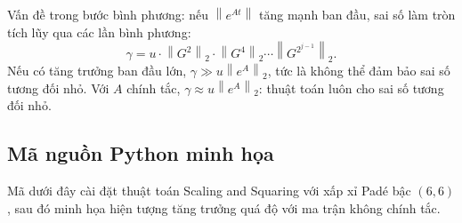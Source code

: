 \documentclass[12pt,a4paper]{report}
\newcommand{\norm}[1]{\left\lVert #1 \right\rVert}
\begin{document}
Vấn đề trong bước bình phương: nếu $\norm{e^{At}}$ tăng mạnh ban đầu, sai số làm tròn
tích lũy qua các lần bình phương:
\[
  \gamma = u \cdot \norm{G^2}_2 \cdot \norm{G^4}_2 \cdots \norm{G^{2^{j-1}}}_2.
\]
Nếu có tăng trưởng ban đầu lớn, $\gamma \gg u\norm{e^A}_2$, tức là không thể đảm bảo
sai số tương đối nhỏ. Với $A$ chính tắc, $\gamma \approx u\norm{e^A}_2$: thuật toán
luôn cho sai số tương đối nhỏ.

\subsection{Mã nguồn Python minh họa}

Mã dưới đây cài đặt thuật toán Scaling and Squaring với xấp xỉ Padé bậc $(6,6)$,
sau đó minh họa hiện tượng tăng trưởng quá độ với ma trận không chính tắc.
\end{document}
